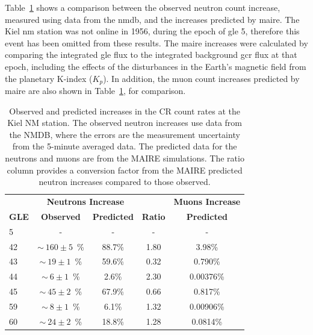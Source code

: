 Table~\ref{tab:KIEL_GLEs} shows a comparison between the observed neutron count increase, measured using data from the \gls{nmdb}, and the increases predicted by \gls{maire}. The Kiel \gls{nm} station was not online in 1956, during the epoch of \gls{gle} 5, therefore this event has been omitted from these results. The \gls{maire} increases were calculated by comparing the integrated \gls{gle} flux to the integrated background \gls{gcr} flux at that epoch, including the effects of the disturbances in the Earth's magnetic field from the planetary K-index ($K_p$). In addition, the muon count increases predicted by \gls{maire} are also shown in Table~\ref{tab:KIEL_GLEs}, for comparison.

\begin{table}[ht!]
	\begin{center}
		\caption{Observed and predicted increases in the CR count rates at the Kiel NM station. The observed neutron increases use data from the NMDB, where the errors are the measurement uncertainty from the 5-minute averaged data. The predicted data for the neutrons and muons are from the MAIRE simulations. The ratio column provides a conversion factor from the MAIRE predicted neutron increases compared to those observed.}
		\label{tab:KIEL_GLEs}
		\begin{tabular}{l c c c | c}
			\hline
			&  \multicolumn{2}{c}{\bf Neutrons Increase} & & {\bf Muons Increase} \\
			{\bf GLE} & {\bf Observed} & {\bf Predicted} & {\bf Ratio} & {\bf Predicted}\\ 
			\hline
			5 & - & - & - & - \\
			42 & $\sim~160\pm5$~\% & 88.7\% & 1.80 & 3.98\% \\
			43 & $\sim~19\pm1$~\% & 59.6\% & 0.32 & 0.790\% \\
			44  & $\sim~6\pm1$~\% & 2.6\% & 2.30 & 0.00376\% \\
			45  & $\sim~45\pm2$~\% & 67.9\% & 0.66 & 0.817\% \\
			59 & $\sim~8\pm1$~\% & 6.1\% & 1.32 & 0.00906\% \\
			60 & $\sim~24\pm2$~\% & 18.8\% & 1.28 & 0.0814\% \\
			\hline
		\end{tabular}
	\end{center}
\end{table}

